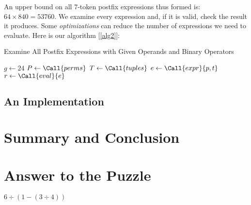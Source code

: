 \documentclass[english,smartquotes]{hgbarticle}
\begin{document}
An upper bound on all 7-token postfix expressions thus formed is: $64\times 840 = 53760$. We examine every expression and, if it is valid, check the result it produces. Some \emph{optimizations} can reduce the number of expressions we need to evaluate. Here is our algorithm [\ref{alg2}]:
\begin{algorithm}
\caption{Examine All Postfix Expressions with Given Operands and Binary Operators}
\label{alg2}
\begin{algorithmic}[2]
  \State $g \gets 24$ 
  \State $P \gets \Call{perms}$  
  \State $T \gets \Call{tuples}$ \Comment {$[t_1, t_2, \dots, t_{64}]$} 
      \State $e \gets \Call {expr}{p, t}$ 
      \State $r \gets \Call {eval}{e}$ 
        \State {}
      \EndIf
    \EndFor
  \EndFor
\end{algorithmic}
\end{algorithm}
\subsection{An Implementation}
\section{Summary and Conclusion}

\section{Answer to the Puzzle}
\begin{rotanswer}
$6\div(1-(3\div 4))$
\end{rotanswer}

\printbibliography %

\end{document}
